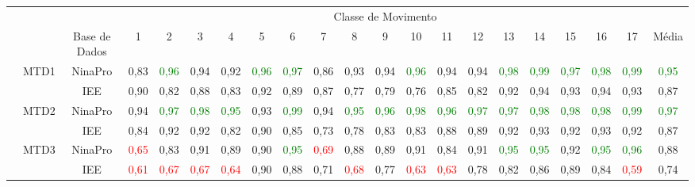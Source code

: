 \begin{sidewaystable}[htb]
	\captionsetup{justification=centering}
	{
		\begin{tabular}{cc|c|ccccccccccccccccc|c}
			\toprule
			&&&	\multicolumn{17}{c}{Classe de Movimento} &\\
			&& Base de Dados & 1&2&3&4&5&6&7&8&9&10&11&12&13&14&15&16&17&Média\\
			\midrule \midrule
			\multirow{8}{*}{\rotatebox{90}{Método}}
			& \multirow{2}{*}{MTD1}	& NinaPro	&0,83	&\textcolor{green}{0,96}	&0,94	&0,92	&\textcolor{green}{0,96}	&\textcolor{green}{0,97}	&0,86	&0,93	&0,94	&\textcolor{green}{0,96}	&0,94	&0,94	&\textcolor{green}{0,98}	&\textcolor{green}{0,99}	&\textcolor{green}{0,97}	&\textcolor{green}{0,98}	&\textcolor{green}{0,99}	&\textcolor{green}{0,95}\\
			&						& IEE		&0,90	&0,82	&0,88	&0,83	&0,92	&0,89	&0,87	&0,77	&0,79	&0,76	&0,85	&0,82	&0,92	&0,94	&0,93	&0,94	&0,93	&0,87\\
			\cline{2-21}                                                                                                                                                             
			& \multirow{2}{*}{MTD2}	& NinaPro	&0,94	&\textcolor{green}{0,97}	&\textcolor{green}{0,98}	&\textcolor{green}{0,95}	&0,93	&\textcolor{green}{0,99}	&0,94	&\textcolor{green}{0,95}	&\textcolor{green}{0,96}	&\textcolor{green}{0,98}	&\textcolor{green}{0,96}	&\textcolor{green}{0,97}	&\textcolor{green}{0,97}	&\textcolor{green}{0,98}	&\textcolor{green}{0,98}	&\textcolor{green}{0,98}	&\textcolor{green}{0,99}	&\textcolor{green}{0,97}\\
			&						& IEE		&0,84	&0,92	&0,92	&0,82	&0,90	&0,85	&0,73	&0,78	&0,83	&0,83	&0,88	&0,89	&0,92	&0,93	&0,92	&0,93	&0,92	&0,87\\
			\cline{2-21}                                                                                                                                                             
			& \multirow{2}{*}{MTD3}	& NinaPro	&\textcolor{red}{0,65}	&0,83	&0,91	&0,89	&0,90	&\textcolor{green}{0,95}	&\textcolor{red}{0,69}	&0,88	&0,89	&0,91	&0,84	&0,91	&\textcolor{green}{0,95}	&\textcolor{green}{0,95}	&0,92	&\textcolor{green}{0,95}	&\textcolor{green}{0,96}	&0,88\\
			&						& IEE		&\textcolor{red}{0,61}	&\textcolor{red}{0,67}	&\textcolor{red}{0,67}	&\textcolor{red}{0,64}	&0,90	&0,88	&0,71	&\textcolor{red}{0,68}	&0,77	&\textcolor{red}{0,63}	&\textcolor{red}{0,63}	&0,78	&0,82	&0,86	&0,89	&0,84	&\textcolor{red}{0,59}	&0,74\\

\end{tabular}}
\end{sidewaystable}
